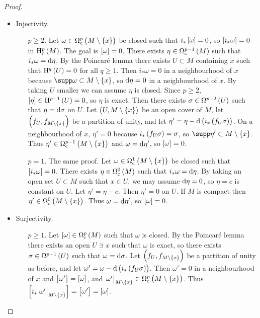 \begin{proof}
\hfill
\begin{itemize}
\item Injectivity.
\begin{itemize}[leftmargin=0.5in]
\item[$ p \ge 2 $.] Let $ \omega \in \Omega_\c^p\br{M \setminus \cbr{x}} $ be closed such that $ i_*\sbr{\omega} = 0 $, so $ \sbr{i_*\omega} = 0 $ in $ \H_\c^p\br{M} $. The goal is $ \sbr{\omega} = 0 $. There exists $ \eta \in \Omega_\c^{p - 1}\br{M} $ such that $ i_*\omega = \mathrm{d}\eta $. By the Poincar\'e lemma there exists $ U \subset M $ containing $ x $ such that $ \H^q\br{U} = 0 $ for all $ q \ge 1 $. Then $ i_*\omega = 0 $ in a neighbourhood of $ x $ because $ \supp \omega \subset M \setminus \cbr{x} $, so $ \mathrm{d}\eta = 0 $ in a neighbourhood of $ x $. By taking $ U $ smaller we can assume $ \eta $ is closed. Since $ p \ge 2 $, $ \sbr{\eta} \in \H^{p - 1}\br{U} = 0 $, so $ \eta $ is exact. Then there exists $ \sigma \in \Omega^{p - 2}\br{U} $ such that $ \eta = \mathrm{d}\sigma $ on $ U $. Let $ \br{U, M \setminus \cbr{x}} $ be an open cover of $ M $, let $ \br{f_U, f_{M \setminus \cbr{x}}} $ be a partition of unity, and let $ \eta' = \eta - \d\br{i_*\br{f_U\sigma}} $. On a neighbourhood of $ x $, $ \eta' = 0 $ because $ i_*\br{f_U\sigma} = \sigma $, so $ \supp \eta' \subset M \setminus \cbr{x} $. Thus $ \eta' \in \Omega_\c^{p - 1}\br{M \setminus \cbr{x}} $ and $ \omega = \mathrm{d}\eta' $, so $ \sbr{\omega} = 0 $.
\item[$ p = 1 $.] The same proof. Let $ \omega \in \Omega_\c^1\br{M \setminus \cbr{x}} $ be closed such that $ \sbr{i_*\omega} = 0 $. There exists $ \eta \in \Omega_\c^0\br{M} $ such that $ i_*\omega = \mathrm{d}\eta $. By taking an open set $ U \subset M $ such that $ x \in U $, we may assume $ \mathrm{d}\eta = 0 $, so $ \eta = c $ is constant on $ U $. Let $ \eta' = \eta - c $. Then $ \eta' = 0 $ on $ U $. If $ M $ is compact then $ \eta' \in \Omega_\c^0\br{M \setminus \cbr{x}} $. Thus $ \omega = \mathrm{d}\eta' $, so $ \sbr{\omega} = 0 $.
\end{itemize}
\item Surjectivity.
\begin{itemize}[leftmargin=0.5in]
\item[$ p \ge 1 $.] Let $ \sbr{\omega} \in \Omega_\c^p\br{M} $ such that $ \omega $ is closed. By the Poincar\'e lemma there exists an open $ U \ni x $ such that $ \omega $ is exact, so there exists $ \sigma \in \Omega^{p - 1}\br{U} $ such that $ \omega = \mathrm{d}\sigma $. Let $ \br{f_U, f_{M \setminus \cbr{x}}} $ be a partition of unity as before, and let $ \omega' = \omega - \d\br{i_*\br{f_U\sigma}} $. Then $ \omega' = 0 $ in a neighbourhood of $ x $ and $ \sbr{\omega'} = \sbr{\omega} $, and $ \eval{\omega'}_{M \setminus \cbr{x}} \in \Omega_\c^p\br{M \setminus \cbr{x}} $. Thus $ \sbr{i_*\eval{\omega'}_{M \setminus \cbr{x}}} = \sbr{\omega'} = \sbr{\omega} $.
\end{itemize}
\end{itemize}
\end{proof}

